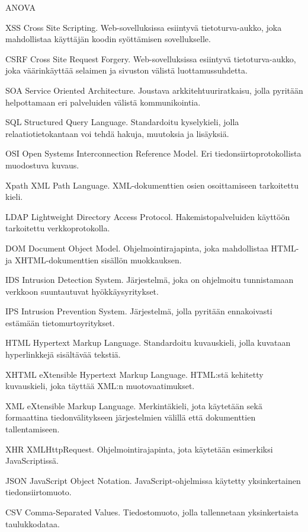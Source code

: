 \begin{abbrlist}{ANOVA}
\item[XSS]	Cross Site Scripting. Web-sovelluksissa esiintyvä tietoturva-aukko, joka mahdollistaa käyttäjän koodin syöttämisen sovellukselle.  
\item[CSRF]	Cross Site Request Forgery. Web-sovelluksissa esiintyvä tietoturva-aukko, joka väärinkäyttää selaimen ja sivuston välistä luottamussuhdetta.
\item[SOA]	Service Oriented Architecture. Joustava arkkitehtuuriratkaisu, jolla pyritään helpottamaan eri palveluiden välistä kommunikointia.
\item[SQL]	Structured Query Language. Standardoitu kyselykieli, jolla relaatiotietokantaan voi tehdä hakuja, muutoksia ja lisäyksiä.
\item[OSI]	Open Systems Interconnection Reference Model. Eri tiedonsiirtoprotokollista muodostuva kuvaus.
\item[Xpath]    XML Path Language. XML-dokumenttien osien osoittamiseen tarkoitettu kieli.	
\item[LDAP]	Lightweight Directory Access Protocol. Hakemistopalveluiden käyttöön tarkoitettu verkkoprotokolla.
\item[DOM]	Document Object Model. Ohjelmointirajapinta, joka mahdollistaa HTML- ja XHTML-dokumenttien sisällön muokkauksen.
\item[IDS]	Intrusion Detection System. Järjestelmä, joka on ohjelmoitu tunnistamaan verkkoon suuntautuvat hyökkäysyritykset.
\item[IPS]	Intrusion Prevention System. Järjestelmä, jolla pyritään ennakoivasti estämään tietomurtoyritykset.
\item[HTML]	Hypertext Markup Language. Standardoitu kuvauskieli, jolla kuvataan hyperlinkkejä sisältävää tekstiä.
\item[XHTML]    eXtensible Hypertext Markup Language. HTML:stä kehitetty kuvauskieli, joka täyttää XML:n muotovaatimukset.
\item[XML]	eXtensible Markup Language. Merkintäkieli, jota käytetään sekä formaattina tiedonvälitykseen järjestelmien välillä että dokumenttien tallentamiseen.
\item[XHR]	XMLHttpRequest. Ohjelmointirajapinta, jota käytetään esimerkiksi Ja\-va\-Scrip\-tis\-sä.
\item[JSON]	JavaScript Object Notation. JavaScript-ohjelmissa käytetty yksinkertainen tiedonsiirtomuoto.
\item[CSV]	Comma-Separated Values. Tiedostomuoto, jolla tallennetaan yksinkertaista taulukkodataa.
\end{abbrlist}
